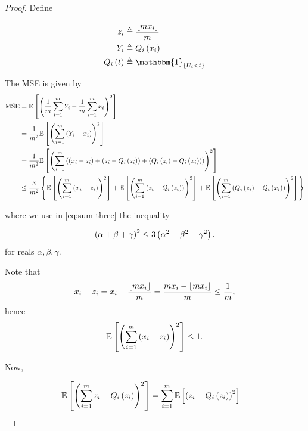 \documentclass[twoside]{article}
\begin{document}
\begin{proof}
    Define

    \begin{align}
        z_i &\triangleq \frac{\floor{mx_i}}{m} \label{eq:zi-def} \\
        Y_i &\triangleq Q_i\brak{x_i} \label{eq:Yi-qi-def} \\
        Q_i\brak{t} &\triangleq \mathbbm{1}_{\cbrak{U_i<{t}}} \label{eq:Qi-def}
    \end{align}

    The MSE is given by
    \begin{align}
        \mathrm{MSE} &= \mathbb{E}\left[ \left(\frac{1}{m}\sum_{i=1}^mY_i - \frac{1}{m}\sum_{i=1}^mx_i\right)^2 \right] \\
                     &= \frac{1}{m^2}\mathbb{E}\left[ \left(\sum_{i=1}^m\left(Y_i-x_i\right)\right)^2 \right] \\
                     &= \frac{1}{m^2}\mathbb{E}\left[ \left(\sum_{i=1}^m\left(\left(x_i-z_i\right)+\left(z_i-Q_i\left(z_i\right)\right)+\left(Q_i\left(z_i\right)-Q_i\left(x_i\right)\right)\right)\right)^2 \right] \label{eq:sum-three} \\
                     &\le \frac{3}{m^2}\left\{\mathbb{E}\left[ \left(\sum_{i=1}^m\left(x_i-z_i\right)\right)^2 \right]+\mathbb{E}\left[ \left(\sum_{i=1}^m\left(z_i-Q_i\left(z_i\right)\right)\right)^2 \right]+\mathbb{E}\left[ \left(\sum_{i=1}^m\left(Q_i\left(z_i\right)-Q_i\left(x_i\right)\right)\right)^2 \right]\right\} \\
    \end{align}

    where we use in \eqref{eq:sum-three} the inequality

    \begin{equation}
        \left(\alpha+\beta+\gamma\right)^2 \le 3\left(\alpha^2+\beta^2+\gamma^2\right).
        \label{eq:sum-three-ineq}
    \end{equation}
    for reals \(\alpha,\beta,\gamma\).

    Note that
    \begin{equation}
        x_i-z_i = x_i - \frac{\lfloor mx_i\rfloor}{m} = \frac{mx_i - \lfloor mx_i\rfloor}{m} \le \frac{1}{m},
    \end{equation}
    hence
    \begin{equation}
        \mathbb{E}\left[ \left(\sum_{i=1}^m\left(x_i-z_i\right)\right)^2 \right] \le 1.
        \label{eq:term-1}
    \end{equation}

    Now,

    \begin{align}
        \mathbb{E}\left[ \left(\sum_{i=1}^mz_i-Q_i\left(z_i\right)\right)^2 \right] &= \sum_{i=1}^m\mathbb{E}\left[ \left(z_i-Q_i\left(z_i\right)\right)^2 \right]
    \end{align}
\end{proof}
\end{document}
